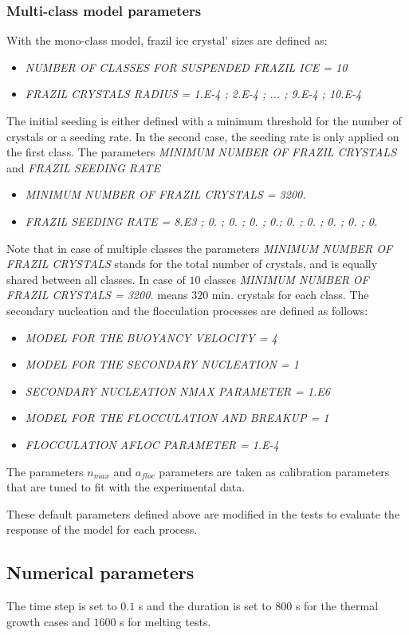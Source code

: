 \subsubsection{Multi-class model parameters}
With the mono-class model, frazil ice crystal' sizes are defined as:
\begin{itemize}
	\item\textit{NUMBER OF CLASSES FOR SUSPENDED FRAZIL ICE = 10}
	\item\textit{FRAZIL CRYSTALS RADIUS = 1.E-4 ; 2.E-4 ; ... ; 9.E-4 ; 10.E-4}
\end{itemize}
The initial seeding is either defined 
with a minimum threshold for the number of crystals or a seeding rate.
In the second case, the seeding rate is only applied on the first class.
The parameters \textit{MINIMUM NUMBER OF FRAZIL CRYSTALS} and \textit{FRAZIL SEEDING RATE}
\begin{itemize}
	\item\textit{MINIMUM NUMBER OF FRAZIL CRYSTALS = 3200.}
	\item\textit{ FRAZIL SEEDING RATE = 8.E3 ; 0. ; 0. ; 0. ; 0.; 0. ; 0. ; 0. ; 0. ; 0.}
\end{itemize}
Note that in case of multiple classes the parameters \textit{MINIMUM NUMBER OF FRAZIL CRYSTALS}
stands for the total number of crystals, and is equally shared between all classes. 
In case of $10$ classes \textit{MINIMUM NUMBER OF FRAZIL CRYSTALS = 3200.} means
$320$ min. crystals for each class.
The secondary nucleation and the flocculation processes are defined as follows:
\begin{itemize}
	\item\textit{MODEL FOR THE BUOYANCY VELOCITY = 4}
	\item\textit{MODEL FOR THE SECONDARY NUCLEATION = 1}
	\item\textit{SECONDARY NUCLEATION NMAX PARAMETER = 1.E6}
	\item\textit{MODEL FOR THE FLOCCULATION AND BREAKUP = 1}
	\item\textit{FLOCCULATION AFLOC PARAMETER = 1.E-4}
\end{itemize}
The parameters $n_{max}$ and $a_{floc}$ parameters are taken as calibration parameters 
that are tuned to fit with the experimental data.

These default parameters defined above are modified in the tests to evaluate the response of the model
for each process.

\subsection{Numerical parameters}
The time step is set to $0.1$ s and the duration is set to $800$ s for the thermal growth cases and $1600$ s for melting tests.

